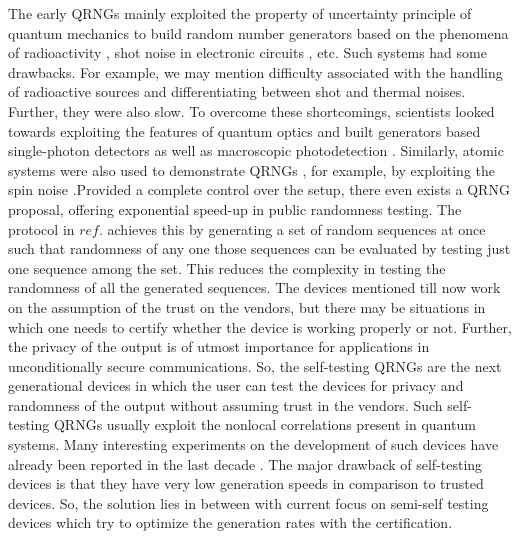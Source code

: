 \documentclass[]{interact}
\theoremstyle{plain}%
\theoremstyle{definition}
\theoremstyle{remark}
\begin{document}
The early QRNGs mainly exploited the property of uncertainty principle of quantum mechanics to build random number generators based on the phenomena of  radioactivity \cite{doi:10.1063/1.1658698,ishida1956random,alkassar2005obtaining}, shot noise in electronic circuits \cite{Vincent_1970,Gude+1985+187+190,586025,847868}, etc. Such systems had some drawbacks. For example, we may mention difficulty associated with the handling of radioactive sources and differentiating between shot and thermal noises. Further, they were also slow. To overcome these shortcomings, scientists looked towards exploiting the features of quantum optics and built generators based single-photon detectors \cite{jennewein2000fast,doi:10.1063/1.2338830,Stefanov_2000,bronner2009demonstrating,grafe2014chip,nie2014practical,khanmohammadi2015monolithic,Yan2014,burri2014spads,doi:10.1063/1.4897485,furst2010high,jian2011two} as well as macroscopic photodetection  \cite{shen2010practical,Gabriel2010,PhysRevLett.59.278,symul2011real,Li_2011,Nie_2015,bustard2011quantum,bustard2013quantum}. Similarly, atomic systems were also used to demonstrate QRNGs \cite{Pironio2010,um2013experimental}, for example, by exploiting the spin noise \cite{PhysRevA.77.054101,PhysRevLett.95.216603,PhysRevLett.98.176401}.Provided a complete control over the setup, there even exists a QRNG proposal, offering exponential speed-up in public randomness testing. The protocol in $ref.$ \cite{jacak2020quantum} achieves this by generating a set of random sequences at once such that randomness of any one those sequences can be evaluated by testing just one sequence among the set. This reduces the complexity in testing the randomness of all the generated sequences. The devices mentioned till now work on the assumption of the trust on the vendors, but there may be situations in which one needs to certify whether the device is working properly or not. Further, the privacy of the output is of utmost importance for applications in unconditionally secure communications. So, the self-testing QRNGs are the next generational devices in which the user can test the devices for privacy and randomness of the output without assuming trust in the vendors. Such self-testing QRNGs usually exploit the nonlocal correlations present in quantum systems. Many interesting experiments on the development of such devices have already been reported in the last decade \cite{colbeck2009quantum,Colbeck_2011,PhysRevA.87.012335,Pironio_2013,giustina2013bell,brandao2016realistic}. The major drawback of self-testing devices is that they have very low generation speeds in comparison to trusted devices. So, the solution lies in between with current focus on semi-self testing devices \cite{Cao_2016,Marangon_2017,PhysRevA.99.062326,Xu_2019,Avesani2018,Cao_2015,PhysRevA.94.060301,Tavakoli2021May,Lunghi_2015,li2011semi} which try to optimize the generation rates with the certification. 
\end{document}
